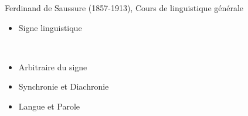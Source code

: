 \documentclass{beamer}
\begin{document}
\begin{frame}
  Ferdinand de Saussure (1857-1913), Cours de linguistique générale
  \begin{itemize}
  \item Signe linguistique

  \begin{figure}
\centering
\mbox{
\quad
{}\quad
{}
}
\end{figure}
  
\item Arbitraire du signe
  \item Synchronie et Diachronie
  \item Langue et Parole
  \end{itemize}
  
\end{frame}
\end{document}
